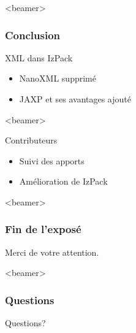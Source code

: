 \begin{frame}<beamer>
\frametitle{Conclusion}
\begin{beamerboxesrounded}[shadow=true]{XML dans IzPack}
\begin{itemize}
	\item NanoXML supprimé
	\item JAXP et ses avantages ajouté
\end{itemize}
\end{beamerboxesrounded}
\end{frame}
\begin{frame}<beamer>
\begin{beamerboxesrounded}[shadow=true]{Contributeurs}
\begin{itemize}
	\item Suivi des apports
	\item Amélioration de IzPack
\end{itemize}
\end{beamerboxesrounded}
\end{frame}
\begin{frame}<beamer>\frametitle{Fin de l'exposé}
\begin{center}
Merci de votre attention.
\end{center}
\end{frame}
\begin{frame}<beamer>\frametitle{Questions}
\begin{center}
Questions?
\end{center}
\end{frame}
